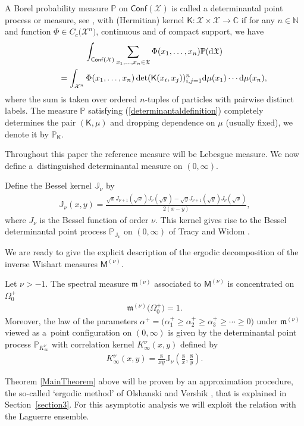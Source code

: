 A Borel probability measure $\mathbb{P}$ on $\mathsf{Conf}(\mathcal{X})$ is called a determinantal point process or measure, see \cite{Soshnikov}, with (Hermitian) kernel $\mathsf{K}\colon \mathcal{X} \times \mathcal{X} \to \mathbb{C}$ if for any $n\in \mathbb{N}$ and function $\Phi\in C_c\big(\mathcal{X}^n\big)$, continuous and of compact support, we have
\begin{gather}
\int_{\mathsf{Conf}(\mathcal{X})}^{} \sum_{x_1, \dots,x_n \in \mathfrak{X}}\Phi(x_1,\dots,x_n)\mathbb{P}({\rm d}\mathfrak{X})\nonumber\\
\qquad{} =\int_{\mathcal{X}^n}^{}\Phi(x_1,\dots,x_n)\det (\mathsf{K}(x_i,x_j) )_{i,j=1}^n{\rm d}\mu(x_1)\cdots {\rm d}\mu(x_n),\label{determinantaldefinition}
\end{gather}
where the sum is taken over ordered $n$-tuples of particles with pairwise distinct labels. The measure $\mathbb{P}$ satisfying (\ref{determinantaldefinition}) completely determines the pair $(\mathsf{K},\mu)$ and dropping dependence on $\mu$ (usually fixed), we denote it by $\mathbb{P}_{\mathsf{K}}$.

Throughout this paper the reference measure will be Lebesgue measure. We now define a~distinguished determinantal measure on $(0,\infty)$.

\begin{Definition}Define the Bessel kernel $\mathbb{J}_{\nu}$ by
\begin{gather*}
\mathbb{J}_{\nu}(x,y)=\frac{\sqrt{x}J_{\nu+1}(\sqrt{x})J_{\nu}(\sqrt{y})-\sqrt{y}J_{\nu+1}(\sqrt{y})J_{\nu}(\sqrt{x})}{2(x-y)},
\end{gather*}
where $J_{\nu}$ is the Bessel function of order $\nu$. This kernel gives rise to the Bessel determinantal point process $\mathbb{P}_{\mathbb{J}_{\nu}}$ on $(0,\infty)$ of Tracy and Widom \cite{TracyWidom}.
\end{Definition}

We are ready to give the explicit description of the ergodic decomposition of the inverse Wishart measures $\mathsf{M}^{(\nu)}$.

\begin{Theorem}\label{MainTheorem}
Let $\nu> -1$. The spectral measure $\mathfrak{m}^{(\nu)}$ associated to $\mathsf{M}^{(\nu)}$ is concentrated on~$\Omega_0^+$
\begin{gather*}
\mathfrak{m}^{(\nu)}\big(\Omega_0^+\big)=1.
\end{gather*}
Moreover, the law of the parameters $\alpha^+=\big(\alpha_1^+\ge \alpha_2^+ \ge \alpha_3^+ \ge \cdots \ge 0 \big)$ under $\mathfrak{m}^{(\nu)}$ viewed as a~point configuration on $(0,\infty)$ is given by the determinantal point process $\mathbb{P}_{K^{\nu}_{\infty}}$ with correlation kernel $K_{\infty}^{\nu}(x,y)$ defined by
\begin{gather*}
K_{\infty}^{\nu}(x,y)=\frac{8}{xy} \mathbb{J}_{\nu}\left(\frac{8}{x},\frac{8}{y}\right).
\end{gather*}
\end{Theorem}

Theorem \ref{MainTheorem} above will be proven by an approximation procedure, the so-called `ergodic method' of Olshanski and Vershik \cite{OlshanskiVershik}, that is explained in Section~\ref{section3}. For this asymptotic analysis we will exploit the relation with the Laguerre ensemble.
